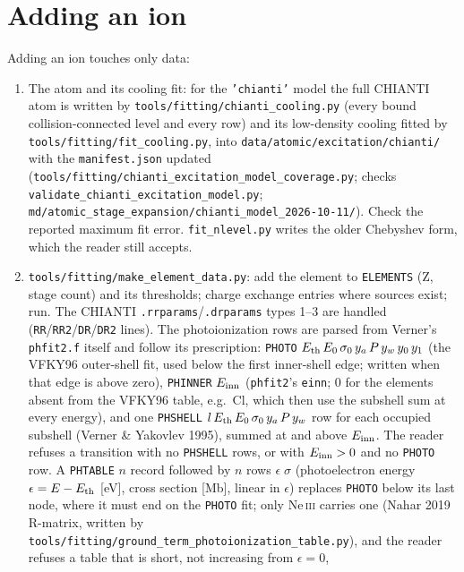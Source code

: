 \documentclass[english,a4paper]{my_memo}
\newcommand{\code}[1]{\texttt{#1}}
\begin{document}
\section{Adding an ion}
Adding an ion touches only data:
\begin{enumerate}
\item The atom and its cooling fit: for the \code{'chianti'} model the
  full CHIANTI atom is written by
  \code{tools/fitting/\allowbreak chianti\_cooling.py} (every bound
  collision-connected level and every row) and its low-density cooling
  fitted by \code{tools/fitting/\allowbreak fit\_cooling.py}, into
  \code{data/atomic/\allowbreak excitation/\allowbreak chianti/} with the
  \code{manifest.json} updated
  (\code{tools/fitting/\allowbreak chianti\_excitation\_model\_coverage.py};
  checks \code{validate\_chianti\_\allowbreak excitation\_model.py};
  \code{md/atomic\_stage\_expansion/\allowbreak chianti\_model\_2026-10-11/}).  Check
  the reported maximum fit error.  \code{fit\_nlevel.py} writes the older
  Chebyshev form, which the reader still accepts.
\item \code{tools/fitting/make\_element\_data.py}: add the element to
  \code{ELEMENTS} (Z, stage count) and its thresholds; charge exchange
  entries where sources exist; run.  The CHIANTI
  \code{.rrparams}/\code{.drparams} types 1--3 are handled
  (\code{RR}/\code{RR2}/\code{DR}/\code{DR2} lines).  The photoionization
  rows are parsed from Verner's \code{phfit2.f} itself and follow its
  prescription: \code{PHOTO} $E_{\rm th}\,E_0\,\sigma_0\,y_a\,P\,y_w\,y_0\,y_1$
  (the VFKY96 outer-shell fit, used below the first inner-shell edge; written
  when that edge is above zero), \code{PHINNER} $E_{\rm inn}$ (\code{phfit2}'s
  \code{einn}; 0 for the elements absent from the VFKY96 table, e.g.\ Cl,
  which then use the subshell sum at every energy), and one \code{PHSHELL}
  $l\,E_{\rm th}\,E_0\,\sigma_0\,y_a\,P\,y_w$ row for each occupied subshell
  (Verner \& Yakovlev 1995), summed at and above $E_{\rm inn}$.  The reader
  refuses a transition with no \code{PHSHELL} rows, or with
  $E_{\rm inn} > 0$ and no \code{PHOTO} row.  A \code{PHTABLE} $n$ record followed by $n$
  rows $\epsilon\;\sigma$ (photoelectron energy $\epsilon = E - E_{\rm th}$
  [eV], cross section [Mb], linear in $\epsilon$) replaces \code{PHOTO}
  below its last node, where it must end on the \code{PHOTO} fit; only
  Ne\,\textsc{iii} carries one (Nahar 2019 R-matrix, written by
  \code{tools/fitting/ground\_term\_photoionization\_table.py}), and the
  reader refuses a table that is short, not increasing from $\epsilon = 0$,

\end{enumerate}
\end{document}

